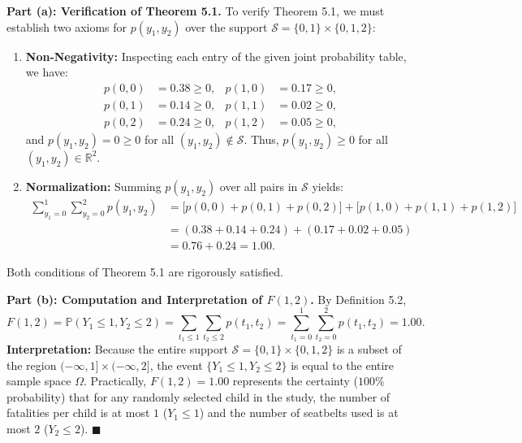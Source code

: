 \documentclass[11pt, letterpaper]{article}
\theoremstyle{definition}
\theoremstyle{remark}
\begin{document}
\textbf{Part (a): Verification of Theorem 5.1.}
To verify Theorem 5.1, we must establish two axioms for $p(y_1, y_2)$ over the support $\mathcal{S} = \{0, 1\} \times \{0, 1, 2\}$:
\begin{enumerate}[label=\arabic*.]
    \item \textbf{Non-Negativity:} Inspecting each entry of the given joint probability table, we have:
    \begin{align*}
        p(0, 0) &= 0.38 \ge 0, & p(1, 0) &= 0.17 \ge 0, \\
        p(0, 1) &= 0.14 \ge 0, & p(1, 1) &= 0.02 \ge 0, \\
        p(0, 2) &= 0.24 \ge 0, & p(1, 2) &= 0.05 \ge 0,
    \end{align*}
    and $p(y_1, y_2) = 0 \ge 0$ for all $(y_1, y_2) \notin \mathcal{S}$. Thus, $p(y_1, y_2) \ge 0$ for all $(y_1, y_2) \in \mathbb{R}^2$.
    \item \textbf{Normalization:} Summing $p(y_1, y_2)$ over all pairs in $\mathcal{S}$ yields:
    \begin{align*}
        \sum_{y_1 = 0}^{1} \sum_{y_2 = 0}^{2} p(y_1, y_2) 
        &= \bigl[p(0, 0) + p(0, 1) + p(0, 2)\bigr] + \bigl[p(1, 0) + p(1, 1) + p(1, 2)\bigr] \\
        &= (0.38 + 0.14 + 0.24) + (0.17 + 0.02 + 0.05) \\
        &= 0.76 + 0.24 = 1.00.
    \end{align*}
\end{enumerate}
Both conditions of Theorem 5.1 are rigorously satisfied.

\textbf{Part (b): Computation and Interpretation of $F(1, 2)$.}
By Definition 5.2,
\[
    F(1, 2) = \mathbb{P}(Y_1 \le 1, Y_2 \le 2) = \sum_{t_1 \le 1} \sum_{t_2 \le 2} p(t_1, t_2) = \sum_{t_1 = 0}^{1} \sum_{t_2 = 0}^{2} p(t_1, t_2) = 1.00.
\]
\textbf{Interpretation:} Because the entire support $\mathcal{S} = \{0, 1\} \times \{0, 1, 2\}$ is a subset of the region $(-\infty, 1] \times (-\infty, 2]$, the event $\{Y_1 \le 1, Y_2 \le 2\}$ is equal to the entire sample space $\Omega$. Practically, $F(1, 2) = 1.00$ represents the certainty ($100\%$ probability) that for any randomly selected child in the study, the number of fatalities per child is at most $1$ ($Y_1 \le 1$) and the number of seatbelts used is at most $2$ ($Y_2 \le 2$). $\blacksquare$

\bigskip
\end{document}
